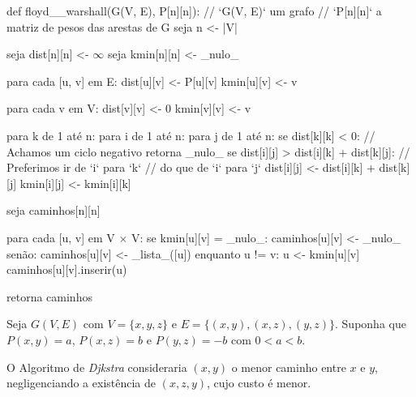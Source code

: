 \documentclass{homework}
\begin{document}
	\begin{algor}
	def floyd__warshall(G(V, E), P[n][n]):
		// `G(V, E)` um grafo
		// `P[n][n]` a matriz de pesos das arestas de G
		seja n <- |V|
		
		seja dist[n][n] <- $\infty$
		seja kmin[n][n] <- _nulo_
		
		para cada [u, v] em E:
			dist[u][v] <- P[u][v] 
			kmin[u][v] <- v
			
		para cada v em V:
			dist[v][v] <- 0
			kmin[v][v] <- v
			
		para k de 1 até n:
			para i de 1 até n:
				para j de 1 até n:
					se dist[k][k] < 0:
						// Achamos um ciclo negativo
						retorna _nulo_
					se dist[i][j] > dist[i][k] + dist[k][j]:
						// Preferimos ir de `i` para `k`
						// do que de `i` para `j`
						dist[i][j] <- dist[i][k] + dist[k][j]
						kmin[i][j] <- kmin[i][k]
						
		seja caminhos[n][n]
		
		para cada [u, v] em V $\times$ V:
			se kmin[u][v] = _nulo_:
				caminhos[u][v] <- _nulo_
			senão:
				caminhos[u][v] <- _lista_([u])
				enquanto u != v:
					u <- kmin[u][v]
					caminhos[u][v].inserir(u)
		
		retorna caminhos
	\end{algor}
	
	\quest %
	
	
	Seja $G(V, E)$ com $V = \{x, y, z\}$ e $E = \{(x, y), (x, z), (y, z)\}$. Suponha que $P(x, y) = a$, $P(x, z) = b$ e $P(y, z) = -b$ com $0 < a < b$.
	\begin{fig}
		
	\end{fig}
	O Algoritmo de \textit{Djkstra} consideraria $(x, y)$ o menor caminho entre $x$ e $y$, negligenciando a existência de $(x, z, y)$, cujo custo é menor. 
	
	
\end{document}

